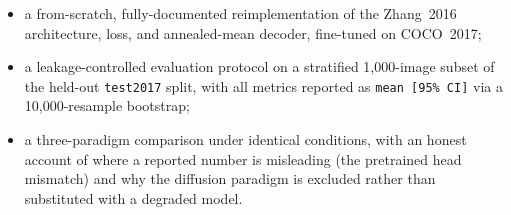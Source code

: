 \begin{itemize}
  \item a from-scratch, fully-documented reimplementation of the Zhang~2016
        architecture, loss, and annealed-mean decoder, fine-tuned on COCO~2017;
  \item a leakage-controlled evaluation protocol on a stratified 1{,}000-image
        subset of the held-out \texttt{test2017} split, with all metrics
        reported as \texttt{mean [95\% CI]} via a 10{,}000-resample bootstrap;
  \item a three-paradigm comparison under identical conditions, with an honest
        account of where a reported number is misleading (the pretrained head
        mismatch) and why the diffusion paradigm is excluded rather than
        substituted with a degraded model.
\end{itemize}
